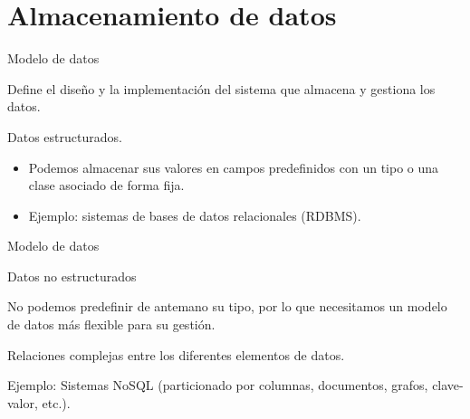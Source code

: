 \section{Almacenamiento de datos}

\begin{frame}{Modelo de datos}
 \begin{wideitemize}
  \item Define el diseño y la implementación del sistema que almacena y gestiona
  los datos.
  \item Datos estructurados.
  \begin{itemize}
   \item Podemos almacenar sus valores en campos predefinidos con un tipo o
   una clase asociado de forma fija.
   \item Ejemplo: sistemas de bases de datos relacionales (RDBMS).
  \end{itemize}

 \end{wideitemize}

\end{frame}


\begin{frame}{Modelo de datos}
 \begin{wideitemize}
  \item Datos no estructurados
  \item No podemos predefinir de antemano su tipo, por lo que necesitamos un modelo
  de datos más flexible para su gestión.
  \item Relaciones complejas entre los diferentes elementos de datos.
  \item Ejemplo: Sistemas NoSQL (particionado por columnas, documentos, grafos,
  clave-valor, etc.).

 \end{wideitemize}

\end{frame}


